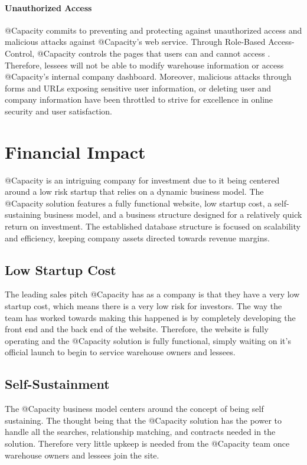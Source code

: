 \paragraph{Unauthorized Access}
@Capacity commits to preventing and protecting against unauthorized access and malicious attacks against @Capacity's web service.  Through Role-Based Access-Control, @Capacity controls the pages that users can and cannot access \cite{abiusx}.  Therefore, lessees will not be able to modify warehouse information or access @Capacity's internal company dashboard.  Moreover, malicious attacks through forms and URLs exposing sensitive user information, or deleting user and company information have been throttled to strive for excellence in online security and user satisfaction.

\section{Financial Impact}
@Capacity is an intriguing company for investment due to it being centered around a low risk startup that relies on a dynamic business model. The @Capacity solution features a fully functional website, low startup cost, a self-sustaining business model, and a business structure designed for a relatively quick return on investment. The established database structure is focused on scalability and efficiency, keeping company assets directed towards revenue margins. 

\subsection{Low Startup Cost}
The leading sales pitch @Capacity has as a company is that they have a very low startup cost, which means there is a very low risk for investors. The way the team has worked towards making this happened is by completely developing the front end and the back end of the website. Therefore, the website is fully operating and the @Capacity solution is fully functional, simply waiting on it's official launch to begin to service warehouse owners and lessees.
\subsection{Self-Sustainment}
The @Capacity business model centers around the concept of being self sustaining. The thought being that the @Capacity solution has the power to handle all the searches, relationship matching, and contracts needed in the solution. Therefore very little upkeep is needed from the @Capacity team once warehouse owners and lessees join the site. 
